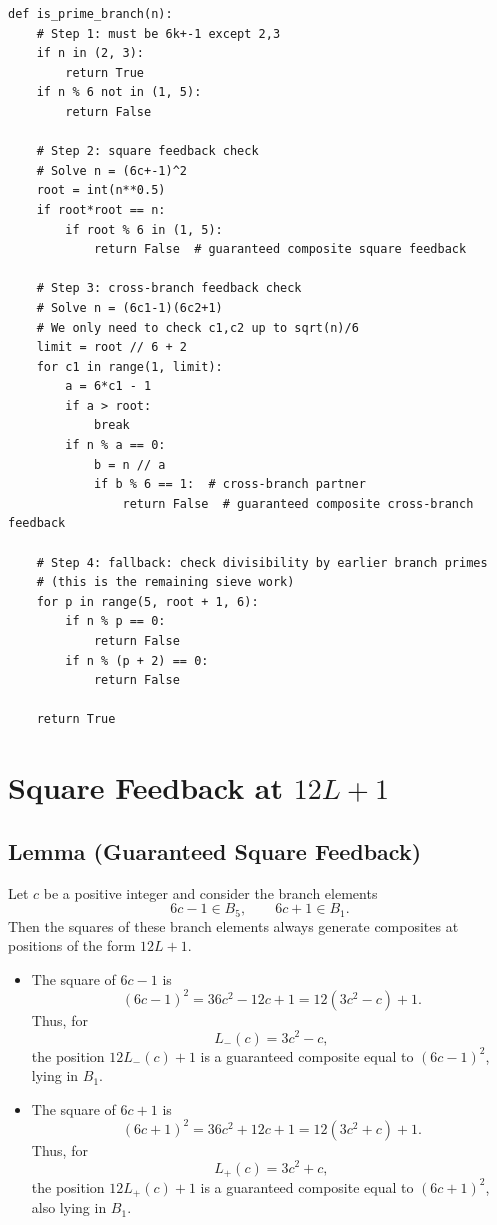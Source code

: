 \documentclass[12pt]{article}
\begin{document}
\begin{lstlisting}
def is_prime_branch(n):
    # Step 1: must be 6k+-1 except 2,3
    if n in (2, 3):
        return True
    if n % 6 not in (1, 5):
        return False

    # Step 2: square feedback check
    # Solve n = (6c+-1)^2
    root = int(n**0.5)
    if root*root == n:
        if root % 6 in (1, 5):
            return False  # guaranteed composite square feedback

    # Step 3: cross-branch feedback check
    # Solve n = (6c1-1)(6c2+1)
    # We only need to check c1,c2 up to sqrt(n)/6
    limit = root // 6 + 2
    for c1 in range(1, limit):
        a = 6*c1 - 1
        if a > root:
            break
        if n % a == 0:
            b = n // a
            if b % 6 == 1:  # cross-branch partner
                return False  # guaranteed composite cross-branch feedback

    # Step 4: fallback: check divisibility by earlier branch primes
    # (this is the remaining sieve work)
    for p in range(5, root + 1, 6):
        if n % p == 0:
            return False
        if n % (p + 2) == 0:
            return False

    return True
\end{lstlisting}

\section{Square Feedback at $12L+1$}

\subsection*{Lemma (Guaranteed Square Feedback)}
Let $c$ be a positive integer and consider the branch elements
\[
6c - 1 \in B_5, \qquad 6c + 1 \in B_1.
\]
Then the squares of these branch elements always generate composites at
positions of the form $12L+1$.

\begin{itemize}
\item[(1)] The square of $6c-1$ is
\[
(6c-1)^2 = 36c^2 - 12c + 1 = 12(3c^2 - c) + 1.
\]
Thus, for
\[
L_-(c) = 3c^2 - c,
\]
the position $12L_-(c)+1$ is a guaranteed composite equal to $(6c-1)^2$,
lying in $B_1$.

\item[(2)] The square of $6c+1$ is
\[
(6c+1)^2 = 36c^2 + 12c + 1 = 12(3c^2 + c) + 1.
\]
Thus, for
\[
L_+(c) = 3c^2 + c,
\]
the position $12L_+(c)+1$ is a guaranteed composite equal to $(6c+1)^2$,
also lying in $B_1$.
\end{itemize}
\end{document}
